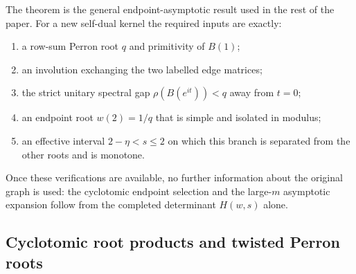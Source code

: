The theorem is the general endpoint-asymptotic result used in the rest
of the paper. For a new self-dual kernel the required inputs are
exactly:

\begin{enumerate}[label=\textup{(\alph*)}]
  \item a row-sum Perron root \(q\) and primitivity of \(B(1)\);
  \item an involution exchanging the two labelled edge matrices;
  \item the strict unitary spectral gap
  \(\rho(B(e^{it}))<q\) away from \(t=0\);
  \item an endpoint root \(w(2)=1/q\) that is simple and isolated in
  modulus;
  \item an effective interval \(2-\eta<s\le2\) on which this branch
  is separated from the other roots and is monotone.
\end{enumerate}
Once these verifications are available, no further information about
the original graph is used: the cyclotomic endpoint selection and the
large-\(m\) asymptotic expansion follow from the completed determinant
\(H(w,s)\) alone.


\subsection{Cyclotomic root products and twisted Perron roots}


